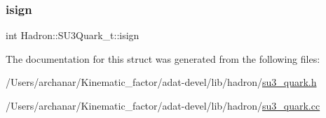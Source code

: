 \subsubsection{\texorpdfstring{isign}{isign}}
{\footnotesize\ttfamily int Hadron\+::\+S\+U3\+Quark\+\_\+t\+::isign}



The documentation for this struct was generated from the following files\+:\begin{DoxyCompactItemize}
\item 
/\+Users/archanar/\+Kinematic\+\_\+factor/adat-\/devel/lib/hadron/\mbox{\hyperlink{adat-devel_2lib_2hadron_2su3__quark_8h}{su3\+\_\+quark.\+h}}\item 
/\+Users/archanar/\+Kinematic\+\_\+factor/adat-\/devel/lib/hadron/\mbox{\hyperlink{adat-devel_2lib_2hadron_2su3__quark_8cc}{su3\+\_\+quark.\+cc}}\end{DoxyCompactItemize}

